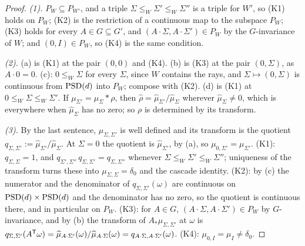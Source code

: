 \begin{proof}
\leanok
\emph{(1).} $P_W \subseteq P_{W'}$, and a triple $\Sigma \le_W \Sigma' \le_W \Sigma''$ is a triple for
$W'$, so (K1) holds on $P_W$; (K2) is the restriction of a continuous map to the subspace $P_W$; (K3)
holds for every $A \in G \subseteq G'$, and $(A\cdot\Sigma, A\cdot\Sigma') \in P_W$ by the
$G$-invariance of $W$; and $(0, I) \in P_W$, so (K4) is the same condition.

\emph{(2).} (a) is (K1) at the pair $(0,0)$ and (K4). (b) is (K3) at the pair $(0, \Sigma)$, as
$A\cdot 0 = 0$. (c): $0 \le_W \Sigma$ for every $\Sigma$, since $W$ contains the rays, and
$\Sigma \mapsto (0, \Sigma)$ is continuous from $\mathrm{PSD}(d)$ into $P_W$; compose with (K2). (d) is (K1) at
$0 \le_W \Sigma \le_W \Sigma'$. If $\mu_{\Sigma'} = \mu_\Sigma * \rho$, then
$\widehat\rho = \widehat\mu_{\Sigma'}/\widehat\mu_\Sigma$ wherever $\widehat\mu_\Sigma \ne 0$, which is
everywhere when $\widehat\mu_\Sigma$ has no zero; so $\rho$ is determined by its transform.

\emph{(3).} By the last sentence, $\mu_{\Sigma,\Sigma'}$ is well defined and its transform is the
quotient $q_{\Sigma,\Sigma'} := \widehat\mu_{\Sigma'}/\widehat\mu_\Sigma$. At $\Sigma = 0$ the quotient is
$\widehat\mu_{\Sigma'}$, by (a), so $\mu_{0,\Sigma'} = \mu_{\Sigma'}$. (K1): $q_{\Sigma,\Sigma} = 1$, and
$q_{\Sigma',\Sigma''}\,q_{\Sigma,\Sigma'} = q_{\Sigma,\Sigma''}$ whenever $\Sigma \le_W \Sigma' \le_W \Sigma''$;
uniqueness of the transform turns these into $\mu_{\Sigma,\Sigma} = \delta_0$ and the cascade identity.
(K2): by (c) the numerator and the denominator of $q_{\Sigma,\Sigma'}(\omega)$ are continuous on
$\mathrm{PSD}(d) \times \mathrm{PSD}(d)$ and the denominator has no zero, so the quotient is continuous there, and in
particular on $P_W$. (K3): for $A \in G$, $(A\cdot\Sigma, A\cdot\Sigma') \in P_W$ by $G$-invariance, and by
(b) the transform of $A_*\mu_{\Sigma,\Sigma'}$ at $\omega$ is
$q_{\Sigma,\Sigma'}(A^{\mathsf{T}}\omega) = \widehat\mu_{A\cdot\Sigma'}(\omega)/\widehat\mu_{A\cdot\Sigma}(\omega)
= q_{A\cdot\Sigma,A\cdot\Sigma'}(\omega)$. (K4): $\mu_{0,I} = \mu_I \ne \delta_0$.
\end{proof}

